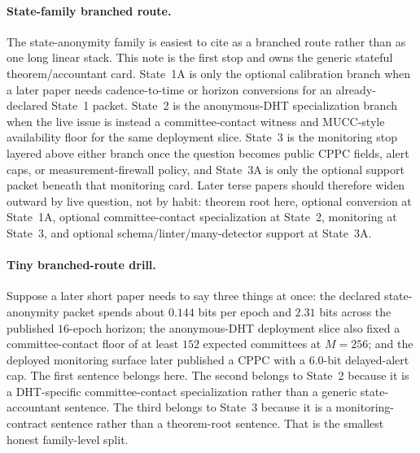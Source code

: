 \documentclass[11pt]{article}
\begin{document}
\paragraph{State-family branched route.}
The state-anonymity family is easiest to cite as a branched route rather than as one long linear stack.  This note is the first stop and owns the generic stateful theorem/accountant card.  State~1A is only the optional calibration branch when a later paper needs cadence-to-time or horizon conversions for an already-declared State~1 packet.  State~2 is the anonymous-DHT specialization branch when the live issue is instead a committee-contact witness and MUCC-style availability floor for the same deployment slice.  State~3 is the monitoring stop layered above either branch once the question becomes public CPPC fields, alert caps, or measurement-firewall policy, and State~3A is only the optional support packet beneath that monitoring card.  Later terse papers should therefore widen outward by live question, not by habit: theorem root here, optional conversion at State~1A, optional committee-contact specialization at State~2, monitoring at State~3, and optional schema/linter/many-detector support at State~3A.\cite{series:state1addendum,series:state2,series:state3,series:state3addendum}

\paragraph{Tiny branched-route drill.}
Suppose a later short paper needs to say three things at once: the declared state-anonymity packet spends about $0.144$ bits per epoch and $2.31$ bits across the published $16$-epoch horizon; the anonymous-DHT deployment slice also fixed a committee-contact floor of at least $152$ expected committees at $M=256$; and the deployed monitoring surface later published a CPPC with a $6.0$-bit delayed-alert cap.  The first sentence belongs here.  The second belongs to State~2 because it is a DHT-specific committee-contact specialization rather than a generic state-accountant sentence.  The third belongs to State~3 because it is a monitoring-contract sentence rather than a theorem-root sentence.  That is the smallest honest family-level split.\cite{series:state2,series:state3}
\end{document}
